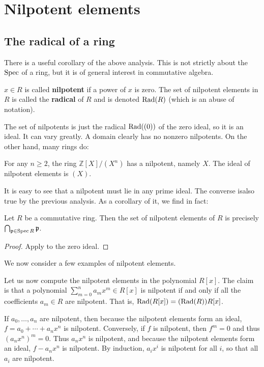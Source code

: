 \section{Nilpotent elements}

\subsection{The radical of a ring}
There is a useful corollary of the above analysis. This is not strictly about
the $\operatorname{Spec}$ of a ring, but it is of general interest in commutative algebra. 

\begin{definition} 
 $x \in R$ is called \textbf{nilpotent} if a power of $x$ is zero. The set of
 nilpotent elements in $R$ is called the \textbf{radical} of $R$ and is denoted
 $\operatorname{Rad}(R)$ (which is an abuse of notation).
\end{definition}

The set of nilpotents is just the radical $\operatorname{Rad}((0))$ of the zero ideal, so it
is an ideal. It can vary greatly. 
A domain clearly has no nonzero nilpotents. On the other hand, many rings do:

\begin{example} 
For any $n \geq 2$, the ring $\mathbb{Z}[X]/(X^n)$ has a nilpotent, namely $X$.
The ideal of nilpotent elements is $(X)$.
\end{example} 

It is easy to see that a nilpotent must lie in any prime ideal. The converse
isalso true by the previous analysis.
As a corollary of it, we find in fact:

\begin{corollary} \label{nilradicalisprimes}
Let $R$ be a commutative ring. Then the set of nilpotent elements of $R$ is
precisely $\bigcap_{\mathfrak{p} \in \operatorname{Spec} R} \mathfrak{p}$.
\end{corollary} 
\begin{proof} 
Apply  to the zero ideal.
\end{proof} 

We now consider a few examples of nilpotent elements.
\begin{example}
Let us now compute the nilpotent elements in the polynomial $R[x]$.
The claim is that a polynomial $\sum_{m=0}^n a_m x^m \in R[x]$ is nilpotent if
and only
if all the coefficients $a_m \in R$ are nilpotent. That is, $\operatorname{Rad}(R[x]) =
(\operatorname{Rad}(R))R[x]$.

If $a_0,\ldots,a_n$ are nilpotent, then because the nilpotent
elements form an ideal, $f=a_0+\cdots+a_nx^n$ is nilpotent. Conversely,
if $f$ is nilpotent, then $f^m=0$ and thus $(a_nx^n)^m=0$. Thus $a_nx^n$
is nilpotent, and because the nilpotent elements form an ideal, $f-a_nx^n$
is nilpotent. By induction, $a_ix^i$ is nilpotent for all $i$, so that all
$a_i$ are nilpotent.
\end{example} 

